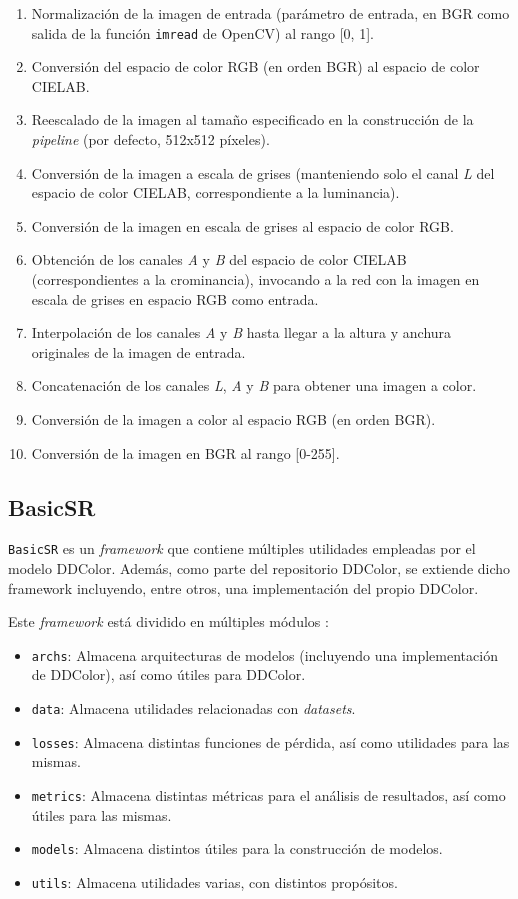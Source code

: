 \documentclass[a4paper]{article}
\begin{document}
\begin{enumerate}
  \item{Normalización de la imagen de entrada (parámetro de entrada, en BGR como salida de la función \texttt{imread} de OpenCV) al rango [0, 1].}
  \item{Conversión del espacio de color RGB (en orden BGR) al espacio de color CIELAB.}
  \item{Reescalado de la imagen al tamaño especificado en la construcción de la \textit{pipeline} (por defecto, 512x512 píxeles).}
  \item{Conversión de la imagen a escala de grises (manteniendo solo el canal \textit{L} del espacio de color CIELAB, correspondiente a la luminancia).}
  \item{Conversión de la imagen en escala de grises al espacio de color RGB.}
  \item{Obtención de los canales \textit{A} y \textit{B} del espacio de color CIELAB (correspondientes a la crominancia), invocando a la red con la imagen en escala de grises en espacio RGB como entrada.}
  \item{Interpolación de los canales \textit{A} y \textit{B} hasta llegar a la altura y anchura originales de la imagen de entrada.}
  \item{Concatenación de los canales \textit{L}, \textit{A} y \textit{B} para obtener una imagen a color.}
  \item{Conversión de la imagen a color al espacio RGB (en orden BGR).}
  \item{Conversión de la imagen en BGR al rango [0-255].}
\end{enumerate}

\subsection{BasicSR}

\texttt{BasicSR}\cite{BasicSR} es un \textit{framework} que contiene múltiples utilidades empleadas por el modelo DDColor. Además, como parte del repositorio DDColor, se extiende dicho framework incluyendo, entre otros, una implementación del propio DDColor.

Este \textit{framework} está dividido en múltiples módulos \cite{BasicSR}:

\begin{itemize}
  \item{\texttt{archs}: Almacena arquitecturas de modelos (incluyendo una implementación de DDColor), así como útiles para DDColor.}
  \item{\texttt{data}: Almacena utilidades relacionadas con \textit{datasets}.}
  \item{\texttt{losses}: Almacena distintas funciones de pérdida, así como utilidades para las mismas.}
  \item{\texttt{metrics}: Almacena distintas métricas para el análisis de resultados, así como útiles para las mismas.}
  \item{\texttt{models}: Almacena distintos útiles para la construcción de modelos.}
  \item{\texttt{utils}: Almacena utilidades varias, con distintos propósitos.}
\end{itemize}
\end{document}
